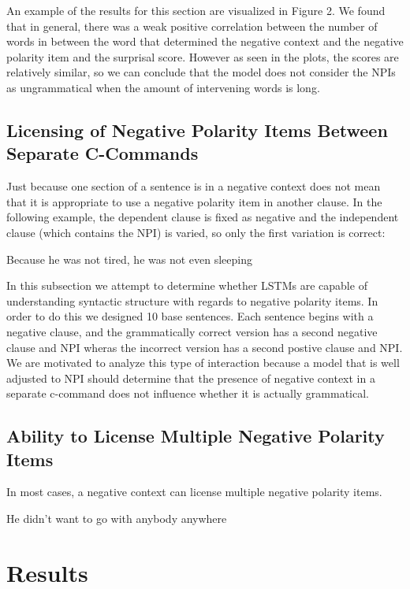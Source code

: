 \documentclass[11pt, round]{article}
\begin{document}
An example of the results for this section are visualized in Figure 2. We found that in general, there was a weak positive correlation between the number of words in between the word that determined the negative context and the negative polarity item and the surprisal score. However as seen in the plots, the scores are relatively similar, so we can conclude that the model does not consider the NPIs as ungrammatical when the amount of intervening words is long.
\subsection{Licensing of Negative Polarity Items Between Separate C-Commands}
Just because one section of a sentence is in a negative context does not mean that it is appropriate to use a negative polarity item in another clause. In the following example, the dependent clause is fixed as negative and the independent clause (which contains the NPI) is varied, so only the first variation is correct:
\begin{exe}
\ex
\begin{xlist}
\ex Because he was not tired, he was not even sleeping
\end{xlist}
\end{exe}
In this subsection we attempt to determine whether LSTMs are capable of understanding syntactic structure with regards to negative polarity items. In order to do this we designed 10 base sentences. Each sentence begins with a negative clause, and the grammatically correct version has a second negative clause and NPI wheras the incorrect version has a second postive clause and NPI. We are motivated to analyze this type of interaction because a model that is well adjusted to NPI should determine that the presence of negative context in a separate c-command does not influence whether it is actually grammatical.
\subsection{Ability to License Multiple Negative Polarity Items}
In most cases, a negative context can license multiple negative polarity items.
\begin{exe}
\ex
\begin{xlist}
\ex He didn't want to go with anybody anywhere
\end{xlist}
\end{exe} 

\section{Results}


\end{document}
